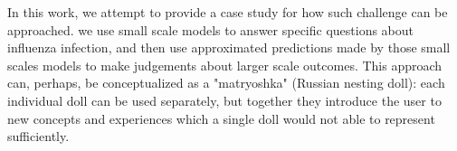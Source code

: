 In this work, we attempt to provide a case study for how such challenge can be approached. we use small scale models to answer specific questions about influenza infection, and then use approximated predictions made by those small scales models to make judgements about larger scale outcomes. This approach can, perhaps, be conceptualized as a "matryoshka" (Russian nesting doll): each individual doll can be used separately, but together they introduce the user to new concepts and experiences which a single doll would not able to represent sufficiently.

















%